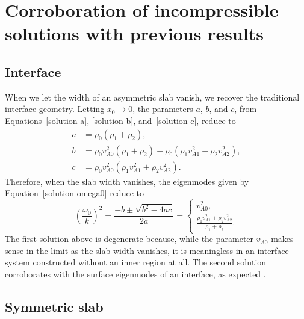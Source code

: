 \documentclass{aastex61}
\begin{document}
\section{Corroboration of incompressible solutions with previous results}

\subsection{Interface}\label{app: interface}
When we let the width of an asymmetric slab vanish, we recover the traditional interface geometry. Letting $x_0 \to 0$, the parameters $a$, $b$, and $c$, from Equations~\eqref{solution a}, \eqref{solution b}, and~\eqref{solution c}, reduce to
\begin{align}
a &= \rho_0(\rho_1 + \rho_2), \\
b &= \rho_0v_{A0}^2(\rho_1 +\rho_2) + \rho_0(\rho_1v_{A1}^2 + \rho_2v_{A2}^2), \\
c &= \rho_0v_{A0}^2(\rho_1v_{A1}^2 + \rho_2v_{A2}^2).
\end{align}
Therefore, when the slab width vanishes, the eigenmodes given by Equation~\eqref{solution omega0} reduce to
\begin{equation}
\left(\frac{\omega_0}{k}\right)^2 = \frac{-b \pm \sqrt{b^2 - 4ac}}{2a} =
\begin{cases}
v_{A0}^2, \\
\frac{\rho_1v_{A1}^2 + \rho_2v_{A2}^2}{\rho_1 + \rho_2}.
\end{cases}
\end{equation}
The first solution above is degenerate because, while the parameter $v_{A0}$ makes sense in the limit as the slab width vanishes, it is meaningless in an interface system constructed without an inner region at all. The second solution corroborates with the surface eigenmodes of an interface, as expected \citep{rob81a}.



\subsection{Symmetric slab}\label{app: symmetric}
\end{document}
